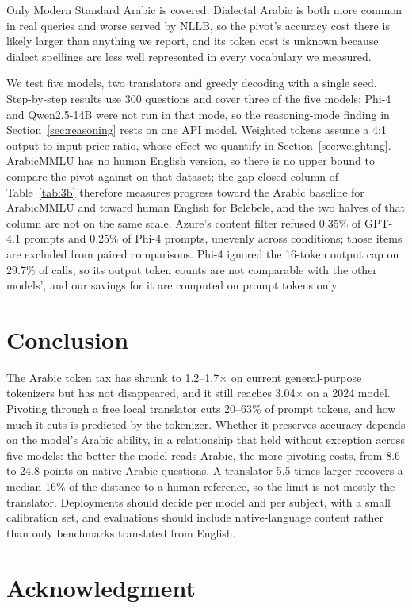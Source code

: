 \documentclass[conference,a4paper]{IEEEtran}
\begin{document}
Only Modern Standard Arabic is covered. Dialectal Arabic is both more common in
real queries and worse served by NLLB, so the pivot's accuracy cost there is
likely larger than anything we report, and its token cost is unknown because
dialect spellings are less well represented in every vocabulary we measured.

We test five models, two translators and greedy decoding with a single seed.
Step-by-step results use 300 questions and cover three of the five models;
Phi-4 and Qwen2.5-14B were not run in that mode, so the reasoning-mode finding
in Section~\ref{sec:reasoning} rests on one API model. Weighted tokens assume a
4:1 output-to-input price ratio, whose effect we quantify in
Section~\ref{sec:weighting}. ArabicMMLU has no human English version, so there
is no upper bound to compare the pivot against on that dataset; the gap-closed
column of Table~\ref{tab:3b} therefore measures progress toward the Arabic
baseline for ArabicMMLU and toward human English for Belebele, and the two
halves of that column are not on the same scale. Azure's content filter refused 0.35\%
of GPT-4.1 prompts and 0.25\% of Phi-4 prompts, unevenly across conditions;
those items are excluded from paired comparisons. Phi-4 ignored the 16-token
output cap on 29.7\% of calls, so its output token counts are not comparable
with the other models', and our savings for it are computed on prompt tokens
only.

\section{Conclusion}

The Arabic token tax has shrunk to 1.2--1.7$\times$ on current general-purpose
tokenizers but has not disappeared, and it still reaches 3.04$\times$ on a 2024
model. Pivoting through a free local translator cuts 20--63\% of prompt tokens,
and how much it cuts is predicted by the tokenizer. Whether it preserves
accuracy depends on the model's Arabic ability, in a relationship that held
without exception across five models: the better the model reads Arabic, the
more pivoting costs, from 8.6 to 24.8 points on native Arabic questions. A
translator 5.5 times larger recovers a median 16\% of the distance to a human
reference, so the limit is not mostly the translator. Deployments should decide
per model and per subject, with a small calibration set, and evaluations should
include native-language content rather than only benchmarks translated from
English.

\section*{Acknowledgment}
\end{document}
